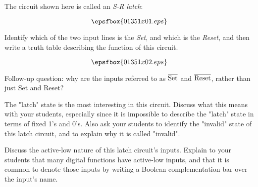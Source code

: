 

The circuit shown here is called an {\it S-R latch}:

$$\epsfbox{01351x01.eps}$$

Identify which of the two input lines is the {\it Set}, and which is the {\it Reset}, and then write a truth table describing the function of this circuit.







$$\epsfbox{01351x02.eps}$$

\vskip 10pt

Follow-up question: why are the inputs referred to as $\overline{\hbox{Set}}$ and $\overline{\hbox{Reset}}$, rather than just Set and Reset?







The "latch" state is the most interesting in this circuit.  Discuss what this means with your students, especially since it is impossible to describe the "latch" state in terms of fixed 1's and 0's.  Also ask your students to identify the "invalid" state of this latch circuit, and to explain why it is called "invalid".

Discuss the active-low nature of this latch circuit's inputs.  Explain to your students that many digital functions have active-low inputs, and that it is common to denote those inputs by writing a Boolean complementation bar over the input's name.



